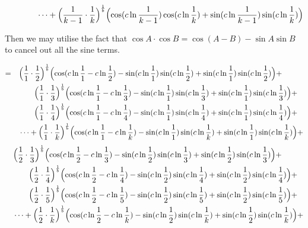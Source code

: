 \documentclass{amsart}
\begin{document}
	\[ \qquad\qquad \dots + \Bigl( \frac{1}{k-1} \cdot \frac{1}{k} \Bigr)^\frac1b \Bigl( \cos(c \ln \frac{1}{k-1}) \cos(c \ln \frac{1}{k}) + \sin(c \ln \frac{1}{k-1}) \sin(c \ln \frac{1}{k}) \Bigr) \]
	
	\[\]
	Then we may utilise the fact that $ \cos{A} \cdot \cos{B} = \cos{(A-B)} - \sin{A}\sin{B} $ to cancel out all the sine terms.
	
	\[
	\begin{aligned}
		= \quad & \Bigl( \frac{1}{1} \cdot \frac{1}{2} \Bigr)^\frac1b \Bigl( \cos(c \ln \frac{1}{1} - c \ln \frac{1}{2}) - \sin(c \ln \frac{1}{1}) \sin(c \ln \frac{1}{2}) + \sin(c \ln \frac{1}{1}) \sin(c \ln \frac{1}{2}) \Bigr) + \\
		& \qquad \Bigl( \frac{1}{1} \cdot \frac{1}{3} \Bigr)^\frac1b \Bigl( \cos(c \ln \frac{1}{1} - c \ln \frac{1}{3}) - \sin(c \ln \frac{1}{1}) \sin(c \ln \frac{1}{3}) + \sin(c \ln \frac{1}{1}) \sin(c \ln \frac{1}{3}) \Bigr) + \\
		& \qquad \Bigl( \frac{1}{1} \cdot \frac{1}{4} \Bigr)^\frac1b \Bigl( \cos(c \ln \frac{1}{1} - c \ln \frac{1}{4}) - \sin(c \ln \frac{1}{1}) \sin(c \ln \frac{1}{4}) + \sin(c \ln \frac{1}{1}) \sin(c \ln \frac{1}{4}) \Bigr) + \\
		& \dots  + \Bigl( \frac{1}{1} \cdot \frac{1}{k} \Bigr)^\frac1b \Bigl( \cos(c \ln \frac{1}{1} - c \ln \frac{1}{k}) - \sin(c \ln \frac{1}{1}) \sin(c \ln \frac{1}{k}) + \sin(c \ln \frac{1}{1}) \sin(c \ln \frac{1}{k}) \Bigr) + 
	\end{aligned}
	\]
	\[
	\begin{aligned}
		\quad & \Bigl( \frac{1}{2} \cdot \frac{1}{3} \Bigr)^\frac1b \Bigl( \cos(c \ln \frac{1}{2} - c \ln \frac{1}{3}) - \sin(c \ln \frac{1}{2}) \sin(c \ln \frac{1}{3}) + \sin(c \ln \frac{1}{2}) \sin(c \ln \frac{1}{3}) \Bigr) + \\
		& \qquad \Bigl( \frac{1}{2} \cdot \frac{1}{4} \Bigr)^\frac1b \Bigl( \cos(c \ln \frac{1}{2} - c \ln \frac{1}{4}) - \sin(c \ln \frac{1}{2}) \sin(c \ln \frac{1}{4}) + \sin(c \ln \frac{1}{2}) \sin(c \ln \frac{1}{4}) \Bigr) + \\
		& \qquad \Bigl( \frac{1}{2} \cdot \frac{1}{5} \Bigr)^\frac1b \Bigl( \cos(c \ln \frac{1}{2} - c \ln \frac{1}{5}) - \sin(c \ln \frac{1}{2}) \sin(c \ln \frac{1}{5}) + \sin(c \ln \frac{1}{2}) \sin(c \ln \frac{1}{5}) \Bigr) + \\
		& \dots  + \Bigl( \frac{1}{2} \cdot \frac{1}{k} \Bigr)^\frac1b \Bigl( \cos(c \ln \frac{1}{2} - c \ln \frac{1}{k}) - \sin(c \ln \frac{1}{2}) \sin(c \ln \frac{1}{k}) + \sin(c \ln \frac{1}{2}) \sin(c \ln \frac{1}{k}) \Bigr) + 
	\end{aligned}
	\]
\end{document}
